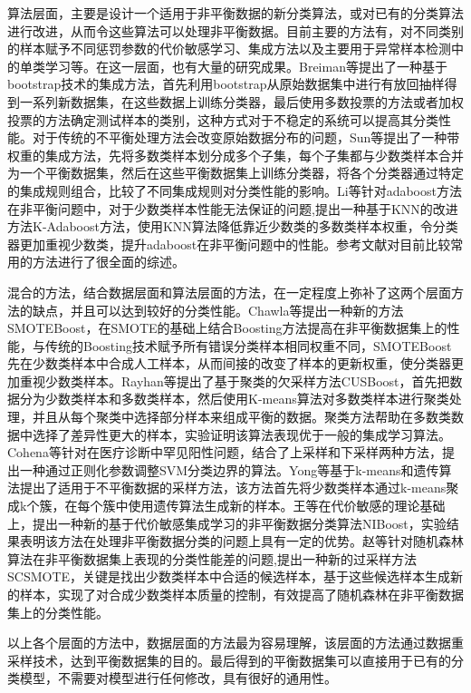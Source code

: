 \documentclass{article}
\newcommand{\upcite}[1]{\textsuperscript{\textsuperscript{\cite{#1}}}} %
\begin{document}
\par
算法层面，主要是设计一个适用于非平衡数据的新分类算法，或对已有的分类算法进行改进，从而令这些算法可以处理非平衡数据。目前主要的方法有，对不同类别的样本赋予不同惩罚参数的代价敏感学习、集成方法以及主要用于异常样本检测中的单类学习等\upcite{spelmen2018review}。在这一层面，也有大量的研究成果。Breiman等\upcite{breiman1996bagging}提出了一种基于bootstrap技术的集成方法，首先利用bootstrap从原始数据集中进行有放回抽样得到一系列新数据集，在这些数据上训练分类器，最后使用多数投票的方法或者加权投票的方法确定测试样本的类别，这种方式对于不稳定的系统可以提高其分类性能。对于传统的不平衡处理方法会改变原始数据分布的问题，Sun等\upcite{sun2015novel}提出了一种带权重的集成方法，先将多数类样本划分成多个子集，每个子集都与少数类样本合并为一个平衡数据集，然后在这些平衡数据集上训练分类器，将各个分类器通过特定的集成规则组合，比较了不同集成规则对分类性能的影响。Li等\upcite{li2017improved}针对adaboost\upcite{freund1997decision}方法在非平衡问题中，对于少数类样本性能无法保证的问题,提出一种基于KNN的改进方法K-Adaboost方法，使用KNN算法降低靠近少数类的多数类样本权重，令分类器更加重视少数类，提升adaboost在非平衡问题中的性能。参考文献\upcite{spelmen2018review}对目前比较常用的方法进行了很全面的综述。
\par
混合的方法，结合数据层面和算法层面的方法，在一定程度上弥补了这两个层面方法的缺点，并且可以达到较好的分类性能。Chawla等\upcite{chawla2003smoteboost}提出一种新的方法SMOTEBoost，在SMOTE的基础上结合Boosting\upcite{schapire1990strength}方法提高在非平衡数据集上的性能，与传统的Boosting技术赋予所有错误分类样本相同权重不同，SMOTEBoost先在少数类样本中合成人工样本，从而间接的改变了样本的更新权重，使分类器更加重视少数类样本。Rayhan等\upcite{rayhan2017cusboost}提出了基于聚类的欠采样方法CUSBoost，首先把数据分为少数类样本和多数类样本，然后使用K-means算法对多数类样本进行聚类处理，并且从每个聚类中选择部分样本来组成平衡的数据。聚类方法帮助在多数类数据中选择了差异性更大的样本，实验证明该算法表现优于一般的集成学习算法。Cohena等\upcite{cohen2006learning}针对在医疗诊断中罕见阳性问题，结合了上采样和下采样两种方法，提出一种通过正则化参数调整SVM分类边界的算法。Yong等\upcite{yong2012research}基于k-means和遗传算法提出了适用于不平衡数据的采样方法，该方法首先将少数类样本通过k-means聚成k个簇，在每个簇中使用遗传算法生成新的样本。王等\upcite{Wang2019research}在代价敏感的理论基础上，提出一种新的基于代价敏感集成学习的非平衡数据分类算法NIBoost，实验结果表明该方法在处理非平衡数据分类的问题上具有一定的优势。赵等\upcite{Zhao2019research}针对随机森林算法在非平衡数据集上表现的分类性能差的问题,提出一种新的过采样方法SCSMOTE，关键是找出少数类样本中合适的候选样本，基于这些候选样本生成新的样本，实现了对合成少数类样本质量的控制，有效提高了随机森林在非平衡数据集上的分类性能。
\par
以上各个层面的方法中，数据层面的方法最为容易理解，该层面的方法通过数据重采样技术，达到平衡数据集的目的。最后得到的平衡数据集可以直接用于已有的分类模型，不需要对模型进行任何修改，具有很好的通用性。
\end{document}
